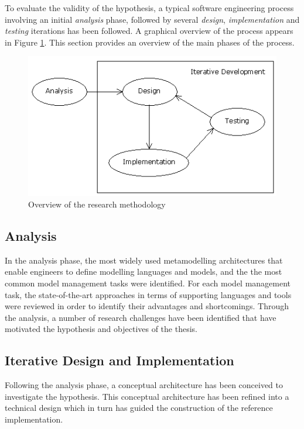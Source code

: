 To evaluate the validity of the hypothesis, a typical software engineering process involving an initial \emph{analysis} phase, followed by several \emph{design}, \emph{implementation} and \emph{testing} iterations has been followed. A graphical overview of the process appears in Figure \ref{fig:ResearchMethodology}. This section provides an overview of the main phases of the process.

\begin{figure}
	\centering
		\includegraphics{images/ResearchMethodology}
	\caption{Overview of the research methodology}
	\label{fig:ResearchMethodology}
\end{figure}

\subsection{Analysis}

In the analysis phase, the most widely used metamodelling architectures that enable engineers to define modelling languages and models, and the the most common model management tasks were identified. For each model management task, the state-of-the-art approaches in terms of supporting languages and tools were reviewed in order to identify their advantages and shortcomings. Through the analysis, a number of research challenges have been identified that have motivated the hypothesis and objectives of the thesis.

\subsection{Iterative Design and Implementation}

Following the analysis phase, a conceptual architecture has been conceived to investigate the hypothesis. This conceptual architecture has been refined into a technical design which in turn has guided the construction of the reference implementation.
 

